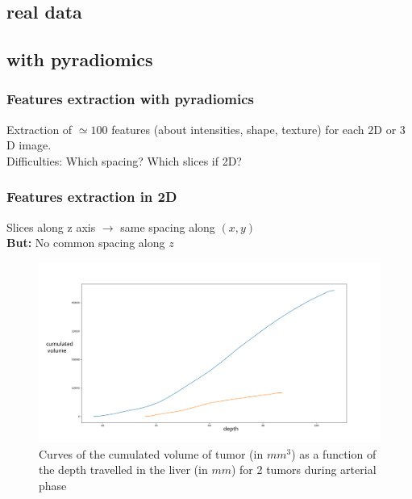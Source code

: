 \documentclass{beamer}
\begin{document}
\begin{frame}
    \section{real data}
    \subsection{with pyradiomics}
\end{frame}

\begin{frame}
    \frametitle{Features extraction with pyradiomics}
    Extraction of $\simeq  100$ features (about intensities, shape, texture) for each $2$D or $3$D image.\\[10 pt]
    Difficulties: Which spacing? Which slices if 2D?\\[25 pt]
\end{frame}

\begin{frame}
    \frametitle{Features extraction in 2D}
    \vspace{5 pt}
    Slices along z axis $\rightarrow$ same spacing along $(x,y)$\\[5 pt]
    \textbf{But:} No common spacing along $z$  
    \begin{figure}
        \centering
        \includegraphics[scale = 0.18]{images/curves_area.png}
        \caption{Curves of the cumulated volume of tumor (in $mm^3$) as a function of the depth travelled in the liver (in $mm$) for 2 tumors during arterial phase}
    \end{figure}
\end{frame}
\end{document}
